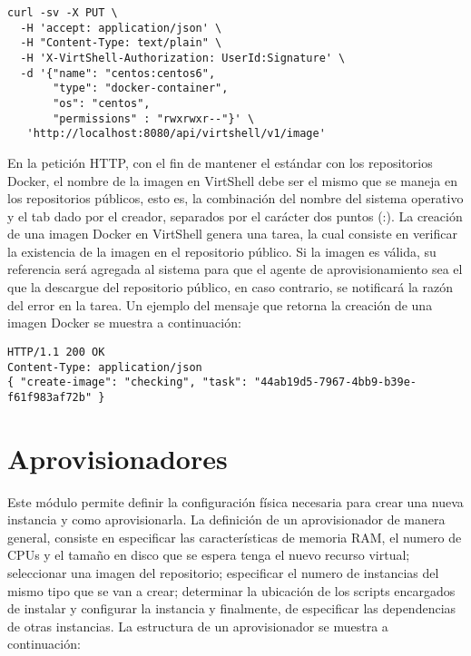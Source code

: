 \vspace{5mm}

\begin{lstlisting}[style=json, caption=Petición HTTP para crear una imagen para contenedores Docker]
curl -sv -X PUT \
  -H 'accept: application/json' \
  -H "Content-Type: text/plain" \
  -H 'X-VirtShell-Authorization: UserId:Signature' \
  -d '{"name": "centos:centos6",
       "type": "docker-container",
       "os": "centos",
       "permissions" : "rwxrwxr--"}' \
   'http://localhost:8080/api/virtshell/v1/image'
\end{lstlisting}

\vspace{5mm}

En la petición HTTP, con el fin de mantener el estándar con los repositorios Docker, el nombre de la imagen en VirtShell debe ser el mismo que se maneja en los repositorios públicos, esto es, la combinación del nombre del sistema operativo y el tab dado por el creador, separados por el carácter dos puntos (:). La creación de una imagen Docker en VirtShell genera una tarea, la cual consiste en verificar la existencia de la imagen en el repositorio público. Si la imagen es válida, su referencia será agregada al sistema para que el agente de aprovisionamiento sea el que la descargue del repositorio público, en caso contrario, se notificará la razón del error en la tarea. Un ejemplo del mensaje que retorna la creación de una imagen Docker se muestra a continuación:

\vspace{5mm}

\begin{lstlisting}[style=json, caption=Ejemplo de respuesta HTTP para la creación de una imagen]
HTTP/1.1 200 OK
Content-Type: application/json
{ "create-image": "checking", "task": "44ab19d5-7967-4bb9-b39e-f61f983af72b" }
\end{lstlisting}


\section{Aprovisionadores}
Este módulo permite definir la configuración física necesaria para crear una nueva instancia y como aprovisionarla. La definición de un aprovisionador de manera general, consiste en especificar las características de memoria RAM, el numero de CPUs y el tamaño en disco que se espera tenga el nuevo recurso virtual; seleccionar una imagen del repositorio; especificar el numero de instancias del mismo tipo que se van a crear; determinar la ubicación de los scripts encargados de instalar y configurar la instancia y finalmente, de especificar las dependencias de otras instancias. La estructura de un aprovisionador se muestra a continuación:

